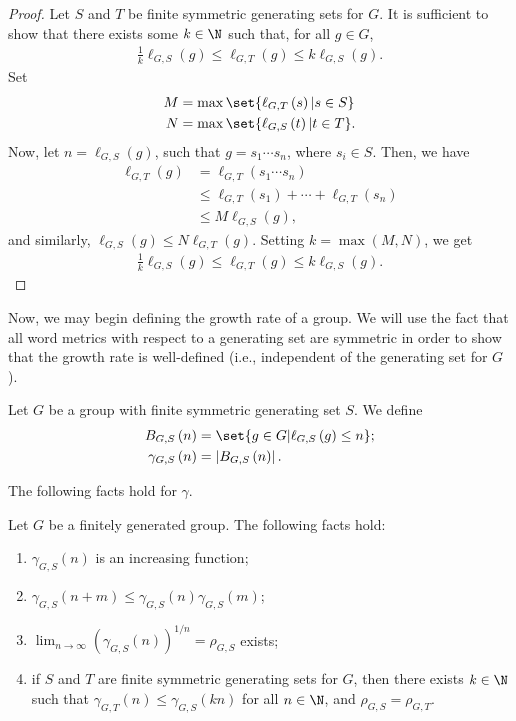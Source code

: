 \documentclass[10pt]{mypackage2}
\begin{document}
\begin{proof}
  Let $S$ and $T$ be finite symmetric generating sets for $G$. It is sufficient to show that there exists some $k\in \N$ such that, for all $g\in G$,
  \begin{align*}
    \frac{1}{k}\ell_{G,S}\left(g\right) \leq \ell_{G,T}\left(g\right) \leq k\ell_{G,S}\left(g\right).
  \end{align*}
  Set
  \begin{align*}
    M &= \max\set{\ell_{G,T}\left(s\right) | s\in S}\\
    N &= \max\set{\ell_{G,S}\left(t\right) | t\in T}.
  \end{align*}
  Now, let $n = \ell_{G,S}\left(g\right)$, such that $g = s_1\cdots s_n$, where $s_i\in S$. Then, we have
  \begin{align*}
    \ell_{G,T}\left(g\right) &= \ell_{G,T}\left(s_1\cdots s_n\right)\\
                             &\leq \ell_{G,T}\left(s_1\right) + \cdots + \ell_{G,T}\left(s_n\right)\\
                             &\leq M\ell_{G,S}\left(g\right),
  \end{align*}
  and similarly, $\ell_{G,S}\left(g\right) \leq N\ell_{G,T}\left(g\right)$. Setting $k = \max\left(M,N\right)$, we get
  \begin{align*}
    \frac{1}{k}\ell_{G,S}\left(g\right) \leq \ell_{G,T}\left(g\right) \leq k\ell_{G,S}\left(g\right).
  \end{align*}
\end{proof}
Now, we may begin defining the growth rate of a group. We will use the fact that all word metrics with respect to a generating set are symmetric in order to show that the growth rate is well-defined (i.e., independent of the generating set for $G$).
\begin{definition}
  Let $G$ be a group with finite symmetric generating set $S$. We define
  \begin{align*}
    B_{G,S}\left(n\right) &= \set{g\in G | \ell_{G,S}\left(g\right) \leq n};\\
    \gamma_{G,S}\left(n\right) &= \left\vert B_{G,S}\left(n\right) \right\vert.
  \end{align*}
\end{definition}
The following facts hold for $\gamma$.
\begin{fact}\label{fact:properties_of_gamma_generating_set}
  Let $G$ be a finitely generated group. The following facts hold:
  \begin{enumerate}[(1)]
    \item $\gamma_{G,S}\left(n\right)$ is an increasing function;
    \item $\gamma_{G,S}\left(n+m\right)\leq \gamma_{G,S}\left(n\right)\gamma_{G,S}\left(m\right)$;
    \item $\displaystyle \lim_{n\rightarrow\infty}\left(\gamma_{G,S}\left(n\right)\right)^{1/n} = \rho_{G,S}$ exists;
    \item if $S$ and $T$ are finite symmetric generating sets for $G$, then there exists $k\in \N$ such that $\gamma_{G,T}\left(n\right)\leq \gamma_{G,S}\left(kn\right)$ for all $n\in\N$, and $\rho_{G,S} = \rho_{G,T}$.
  \end{enumerate}
\end{fact}
\end{document}
